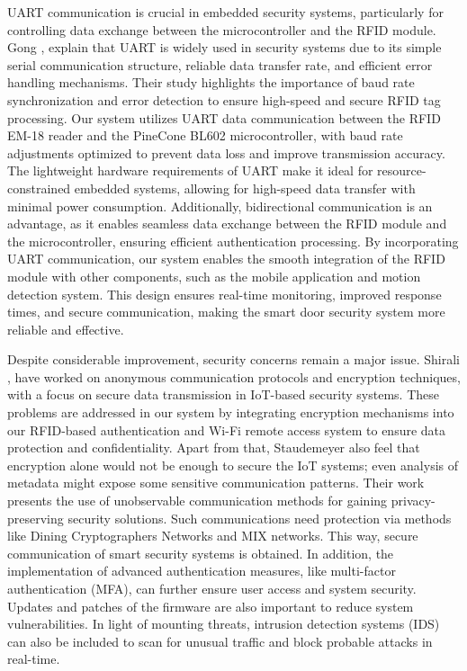 \documentclass[a4paper]{scrartcl}
\begin{document}
UART communication is crucial in embedded security systems, particularly for controlling data exchange between the microcontroller and the RFID module. Gong \cite{Gong2023}, explain that UART is widely used in security systems due to its simple serial communication structure, reliable data transfer rate, and efficient error handling mechanisms. Their study highlights the importance of baud rate synchronization and error detection to ensure high-speed and secure RFID tag processing. Our system utilizes UART data communication between the RFID EM-18 reader and the PineCone BL602 microcontroller, with baud rate adjustments optimized to prevent data loss and improve transmission accuracy. The lightweight hardware requirements of UART make it ideal for resource-constrained embedded systems, allowing for high-speed data transfer with minimal power consumption. Additionally, bidirectional communication is an advantage, as it enables seamless data exchange between the RFID module and the microcontroller, ensuring efficient authentication processing. By incorporating UART communication, our system enables the smooth integration of the RFID module with other components, such as the mobile application and motion detection system. This design ensures real-time monitoring, improved response times, and secure communication, making the smart door security system more reliable and effective.

Despite considerable improvement, security concerns remain a major issue. Shirali \cite{shirali2022survey}, have worked on anonymous communication protocols and encryption techniques, with a focus on secure data transmission in IoT-based security systems. These problems are addressed in our system by integrating encryption mechanisms into our RFID-based authentication and Wi-Fi remote access system to ensure data protection and confidentiality. Apart from that, Staudemeyer  \cite{Staudemeyer2018} also feel that encryption alone would not be enough to secure the IoT systems; even analysis of metadata might expose some sensitive communication patterns. Their work presents the use of unobservable communication methods for gaining privacy-preserving security solutions. Such communications need protection via methods like Dining Cryptographers Networks and MIX networks. This way, secure communication of smart security systems is obtained. In addition, the implementation of advanced authentication measures, like multi-factor authentication (MFA), can further ensure user access and system security. Updates and patches of the firmware are also important to reduce system vulnerabilities. In light of mounting threats, intrusion detection systems (IDS) can also be included to scan for unusual traffic and block probable attacks in real-time.
\end{document}
